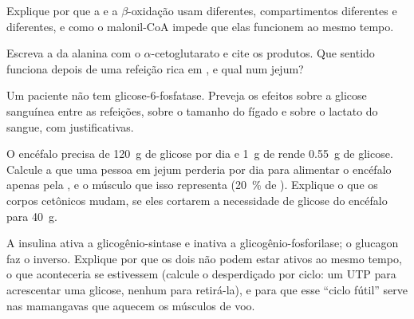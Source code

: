 \begin{exercise}[$\star\star$]\label{exo:b1:biosyntheses-integration:7}
Explique por que a  e a $\beta$-oxidação usam
 diferentes, compartimentos diferentes e  diferentes, e
como o malonil-CoA impede que elas funcionem ao mesmo tempo.
\end{exercise}

\begin{exercise}[$\star\star$]\label{exo:b1:biosyntheses-integration:8}
Escreva a  da alanina com o $\alpha$-cetoglutarato e cite
os produtos. Que sentido funciona depois de uma refeição rica em
, e qual num jejum?
\end{exercise}

\begin{exercise}[$\star\star$]\label{exo:b1:biosyntheses-integration:9}
Um paciente não tem glicose-6-fosfatase. Preveja os efeitos sobre a
glicose sanguínea entre as refeições, sobre o tamanho do fígado e sobre
o lactato do sangue, com justificativas.
\end{exercise}

\begin{exercise}[$\star\star\star$]\label{exo:b1:biosyntheses-integration:10}
O encéfalo precisa de \qty{120}{g} de glicose por dia e \qty{1}{g} de
 rende \qty{0.55}{g} de glicose. Calcule a  que uma
pessoa em jejum perderia por dia para alimentar o encéfalo apenas pela
, e o músculo que isso representa (\qty{20}{\%} de
). Explique o que os corpos cetônicos mudam, se eles cortarem a
necessidade de glicose do encéfalo para \qty{40}{g}.
\end{exercise}

\begin{exercise}[$\star\star\star$]\label{exo:b1:biosyntheses-integration:11}
A insulina ativa a glicogênio-sintase e inativa a
glicogênio-fosforilase; o glucagon faz o inverso. Explique por que os
dois não podem estar ativos ao mesmo tempo, o que aconteceria se
estivessem (calcule o  desperdiçado por ciclo: um UTP para
acrescentar uma glicose, nenhum para retirá-la), e para que esse
``ciclo fútil'' serve nas mamangavas que aquecem os músculos de voo.
\end{exercise}

